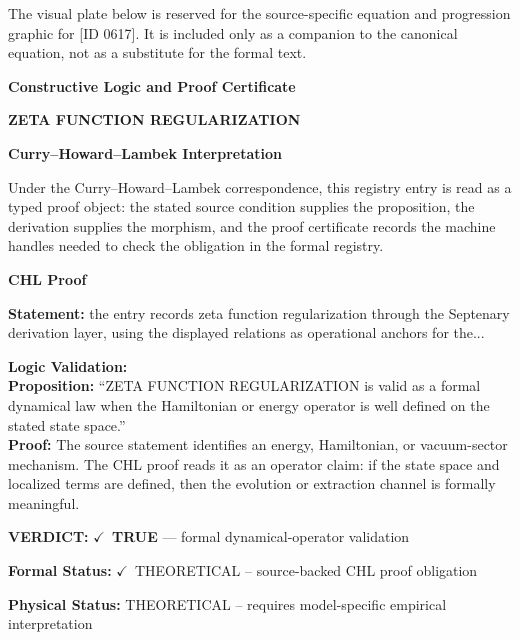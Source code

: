 \begingroup\footnotesize\sloppy
The visual plate below is reserved for the source-specific equation and progression graphic for [ID 0617]. It is included only as a companion to the canonical equation, not as a substitute for the formal text.
\par\endgroup
\ifTZPDarkEdition
{}
\fi

\clearpage
\begingroup\tzpsupportsetup
\noindent\textbf{\fontsize{10.8pt}{12.8pt}\selectfont [ID 0617] Constructive Logic and Proof Certificate}\par
\noindent\textbf{\fontsize{10pt}{12pt}\selectfont ZETA FUNCTION REGULARIZATION}\par
\vspace{0.45em}
\begingroup
\footnotesize
\setlength{\parskip}{0.22em}
\setlength{\parindent}{0pt}
\noindent\textbf{Curry--Howard--Lambek Interpretation}\par
Under the Curry--Howard--Lambek correspondence, this registry entry is read as a typed proof
object: the stated source condition supplies the proposition, the derivation supplies the
morphism, and the proof certificate records the machine handles needed to check the obligation
in the formal registry.

\vspace{0.45em}
\noindent\textbf{CHL Proof}\par
\textbf{Statement:} the entry records zeta function regularization through the Septenary derivation layer,
using the displayed relations as operational anchors for the...

\textbf{Logic Validation:}\\
\textbf{Proposition:} ``ZETA FUNCTION REGULARIZATION is valid as a formal dynamical law when the Hamiltonian or
energy operator is well defined on the stated state space.''\\
\textbf{Proof:} The source statement identifies an energy, Hamiltonian, or vacuum-sector mechanism. The
CHL proof reads it as an operator claim: if the state space and localized terms are
defined, then the evolution or extraction channel is formally meaningful.

\textbf{VERDICT:} \ensuremath{\checkmark}\ \textbf{TRUE} --- formal dynamical-operator validation

\textbf{Formal Status:} \ensuremath{\checkmark}\ THEORETICAL -- source-backed CHL proof obligation

\textbf{Physical Status:} THEORETICAL -- requires model-specific empirical interpretation
\par\vspace{0.45em}
\par
\ifTZPDarkEdition
{}
\fi
\endgroup
\endgroup
